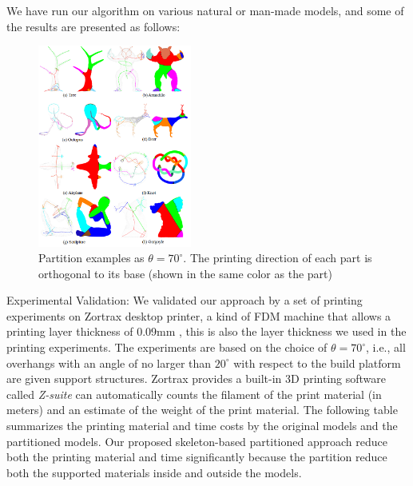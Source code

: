 We have run our algorithm on various natural or man-made models, and some of the results are presented as follows:

\begin{figure}[tbp]
  \centering
  \includegraphics[width=0.45\textwidth]{figs/programming.png}
  \caption{\label{fig:programming}%
           Partition examples as $\theta = 70^{\circ}$. The printing direction of each part is orthogonal to its base (shown in the same color as the part)}
\end{figure}

Experimental Validation: We validated our approach by a set of printing experiments on Zortrax desktop printer, a kind of FDM machine that allows a printing layer thickness of 0.09mm , this is also the layer thickness we used in the printing experiments. The experiments are based on the choice of $\theta = 70^{\circ}$, i.e., all overhangs with an angle of no larger than $20^{\circ}$ with respect to the build platform are given support structures. Zortrax provides a built-in 3D printing software called \emph{Z-suite} can automatically counts the filament of the print material (in meters) and an estimate of the weight of the print material. The following table summarizes the printing material and time costs by the original models and the partitioned models. Our proposed skeleton-based partitioned approach reduce both the printing material and time significantly because the partition reduce both the supported materials inside and outside the models.



